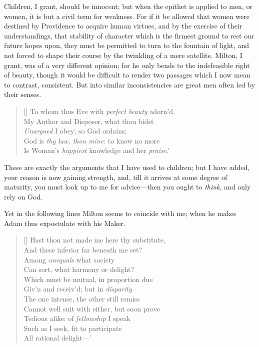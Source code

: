 Children, I grant, should be innocent; but when the epithet is applied
to men, or women, it is but a civil term for weakness. For if it be
allowed that women were destined by Providence to acquire human
virtues, and by the exercise of their understandings, that stability
of character which is the firmest  ground to rest our future
hopes upon, they must be permitted to turn to the fountain of light,
and not forced to shape their course by the twinkling of a mere
satellite. Milton, I grant, was of a very different opinion; for he
only bends to the indefeasible right of beauty, though it would be
difficult to render two passages which I now mean to contrast,
consistent. But into similar inconsistencies are great men often led
by their senses.

\settowidth{}
\begin{verse}[\versewidth]
To whom thus Eve with \textit{perfect beauty} adorn'd.\\
My Author and Disposer, what thou bidst\\
\textit{Unargued} I obey; so God ordains;\\
God is \textit{thy law, thou mine}: to know no more\\
Is Woman's \textit{happiest} knowledge and her \textit{praise}.'
\end{verse}

These are exactly the arguments that I have used to children; but I
have added, your reason is now gaining strength, and, till it arrives
at some degree of maturity, you must look up to me for ad\-vice---then
you ought to \textit{think}, and only rely on God.

Yet in the following lines Milton seems to coincide with me; when he
makes Adam thus expostulate with his Maker.

\settowidth{}
\begin{verse}[\versewidth]
Hast thou not made me here thy substitute,\\
And these inferior far beneath me set?\\
Among \textit{unequals} what society\\
Can sort, what harmony or delight?\\
Which must be mutual, in proportion due\\
Giv'n and receiv'd; but in \textit{disparity}\\
The one intense, the other still remiss\\
Cannot well suit with either, but soon prove\\
Tedious alike: of \textit{fellowship} I speak\\
Such as I seek, fit to participate\\
All rational delight---'
\end{verse}

